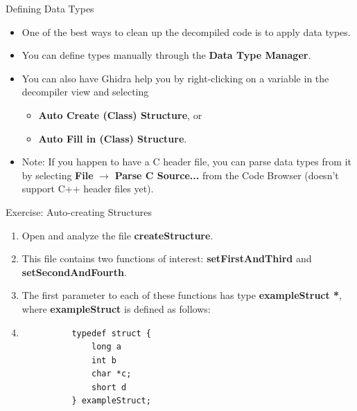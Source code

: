 \documentclass{beamer}
\begin{document}
\begin{frame}
\begin{block}{Defining Data Types}
\begin{itemize}
\item One of the best ways to clean up the decompiled code is to apply data types.
\item You can define types manually through the \textbf{Data Type Manager}.
\item You can also have Ghidra help you by right-clicking on a variable in the decompiler view and selecting 
\begin{itemize}
\item \textbf{Auto Create (Class) Structure}, or 
\item \textbf{Auto Fill in (Class) Structure}.
\end{itemize}
\item Note: If you happen to have a C header file, you can parse data types from it by selecting \textbf{File} $\rightarrow$ \textbf{Parse C Source...} 
from the Code Browser (doesn't support C++ header files yet).
\end{itemize}
\end{block}
\end{frame}

\begin{frame}[fragile]
\begin{block}{Exercise: Auto-creating Structures}
\begin{enumerate}
\item Open and analyze the file \textbf{createStructure}.
\item[] This file contains two functions of interest: \textbf{setFirstAndThird} and \textbf{setSecondAndFourth}. 
\item[] The first parameter to each of these functions has type \textbf{exampleStruct *}, where \textbf{exampleStruct} is defined as follows:
\item[] \begin{verbatim}
          typedef struct {
              long a
              int b
              char *c;
              short d
          } exampleStruct;
\end{verbatim}
\end{enumerate}
\end{block}
\end{frame}
\end{document}
